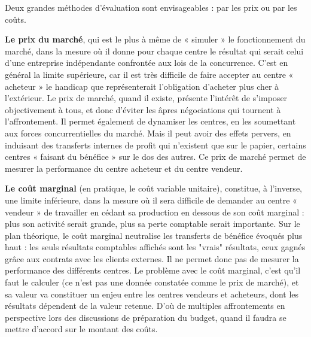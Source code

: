 \documentclass[oneside]{kaobook}
\begin{document}
Deux grandes méthodes d’évaluation sont envisageables : par les prix ou par les coûts.

\textbf{Le prix du marché}, qui est le plus à même de « simuler » le fonctionnement du marché, dans la mesure où il donne pour chaque centre le résultat qui serait celui d’une entreprise indépendante confrontée aux lois de la concurrence. C’est en général la limite supérieure, car il est très difficile de faire accepter au centre « acheteur » le handicap que représenterait l’obligation d’acheter plus cher à l’extérieur.
Le prix de marché, quand il existe, présente l’intérêt de s’imposer objectivement à tous, et donc d’éviter les âpres négociations qui tournent à l’affrontement. Il permet également de dynamiser les centres, en les soumettant aux forces concurrentielles du marché. Mais il peut avoir des effets pervers, en induisant des transferts internes de profit qui n’existent que sur le papier, certains centres « faisant du bénéfice » sur le dos des autres.
Ce prix de marché permet de mesurer la performance du centre acheteur et du centre vendeur.

\textbf{Le coût marginal} (en pratique, le coût variable unitaire), constitue, à l’inverse, une limite inférieure, dans la mesure où il sera difficile de demander au centre « vendeur » de travailler en cédant sa production en dessous de son coût marginal : plus son activité serait grande, plus sa perte comptable serait importante. Sur le plan théorique, le coût marginal neutralise les transferts de bénéfice évoqués plus haut : les seuls résultats comptables affichés sont les "vrais" résultats, ceux gagnés grâce aux contrats avec les clients externes. Il ne permet donc pas de mesurer la performance des différents centres.
Le problème avec le coût marginal, c’est qu’il faut le calculer (ce n’est pas une donnée constatée comme le prix de marché), et sa valeur va constituer un enjeu entre les centres vendeurs et acheteurs, dont les résultats dépendent de la valeur retenue. D’où de multiples affrontements en perspective lors des discussions de préparation du budget, quand il faudra se mettre d’accord sur le montant des coûts.
\end{document}
